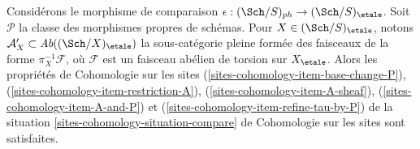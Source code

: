 \begin{lemma}
\label{lemma-compare-ph-etale}
Considérons le morphisme de comparaison
$\epsilon : (\Sch/S)_{ph} \to (\Sch/S)_\etale$.
Soit $\mathcal{P}$ la classe des morphismes propres de schémas.
Pour $X \in (\Sch/S)_\etale$, notons
$\mathcal{A}'_X \subset \textit{Ab}((\Sch/X)_\etale)$
la sous-catégorie pleine formée des faisceaux de la forme
$\pi_X^{-1}\mathcal{F}$, où $\mathcal{F}$ est un
faisceau abélien de torsion sur $X_\etale$.
Alors les propriétés de Cohomologie sur les sites
(\ref{sites-cohomology-item-base-change-P}),
(\ref{sites-cohomology-item-restriction-A}),
(\ref{sites-cohomology-item-A-sheaf}),
(\ref{sites-cohomology-item-A-and-P}) et
(\ref{sites-cohomology-item-refine-tau-by-P})
de la situation \ref{sites-cohomology-situation-compare} de Cohomologie sur les sites
sont satisfaites.
\end{lemma}


